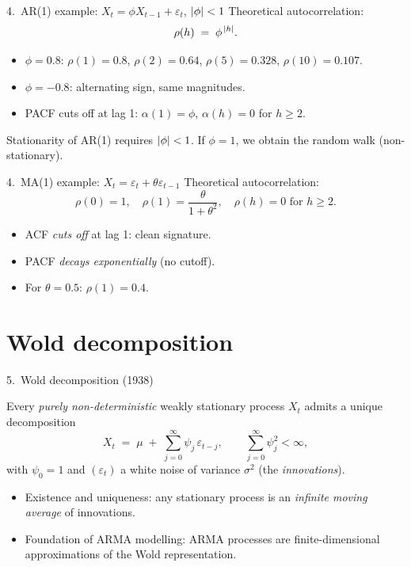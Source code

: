 \documentclass[aspectratio=169]{beamer}
\begin{document}
\begin{frame}{4.~AR(1) example: $X_t = \phi X_{t-1} + \varepsilon_t$, $\left\lvert \phi \right\rvert < 1$}
  Theoretical autocorrelation:
  \[
    \rho(h) \;=\; \phi^{\,\left\lvert h \right\rvert}.
  \]
  \medskip
  \begin{itemize}
    \item $\phi = 0.8$: $\rho(1) = 0.8$, $\rho(2) = 0.64$, $\rho(5) = 0.328$, $\rho(10) = 0.107$.
    \item $\phi = -0.8$: alternating sign, same magnitudes.
    \item PACF cuts off at lag 1: $\alpha(1) = \phi$, $\alpha(h) = 0$
          for $h \geq 2$.
  \end{itemize}
  \medskip
  \begin{warnbox}
    Stationarity of AR(1) requires $\left\lvert \phi \right\rvert < 1$. If $\phi = 1$, we
    obtain the random walk (non-stationary).
  \end{warnbox}
\end{frame}

\begin{frame}{4.~MA(1) example: $X_t = \varepsilon_t + \theta \varepsilon_{t-1}$}
  Theoretical autocorrelation:
  \[
    \rho(0) = 1,
    \quad
    \rho(1) = \frac{\theta}{1 + \theta^2},
    \quad
    \rho(h) = 0 \text{ for } h \geq 2.
  \]
  \medskip
  \begin{itemize}
    \item ACF \emph{cuts off} at lag 1: clean signature.
    \item PACF \emph{decays exponentially} (no cutoff).
    \item For $\theta = 0.5$: $\rho(1) = 0.4$.
  \end{itemize}
\end{frame}

\section{Wold decomposition}

\begin{frame}{5.~Wold decomposition (1938)}
  \begin{thbox}
    Every \emph{purely non-deterministic} weakly stationary process
    $X_t$ admits a unique decomposition
    \[
      X_t \;=\; \mu \;+\; \sum_{j = 0}^{\infty} \psi_j\, \varepsilon_{t - j},
      \qquad \sum_{j = 0}^{\infty} \psi_j^2 < \infty,
    \]
    with $\psi_0 = 1$ and $(\varepsilon_t)$ a white noise of variance
    $\sigma^2$ (the \emph{innovations}).
  \end{thbox}
  \medskip
  \begin{itemize}
    \item Existence and uniqueness: any stationary process is an
          \emph{infinite moving average} of innovations.
    \item Foundation of ARMA modelling: ARMA processes are
          finite-dimensional approximations of the Wold representation.
  \end{itemize}
\end{frame}
\end{document}
